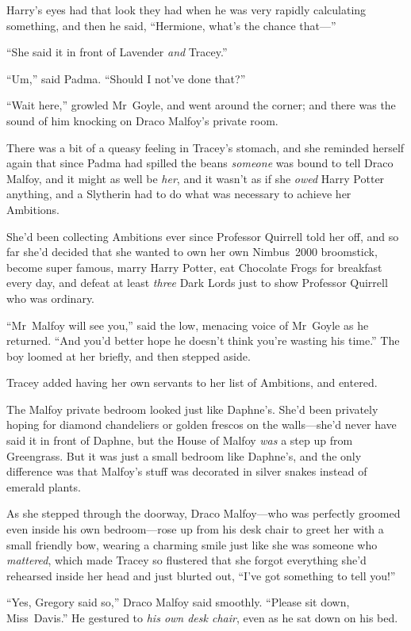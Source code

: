 Harry’s eyes had that look they had when he was very rapidly calculating something, and then he said, “Hermione, what’s the chance that—”

“She said it in front of Lavender \emph{and} Tracey.”

“Um,” said Padma. “Should I not’ve done that?”

\later

“Wait here,” growled Mr~Goyle, and went around the corner; and there was the sound of him knocking on Draco Malfoy’s private room.

There was a bit of a queasy feeling in Tracey’s stomach, and she reminded herself again that since Padma had spilled the beans \emph{someone} was bound to tell Draco Malfoy, and it might as well be \emph{her}, and it wasn’t as if she \emph{owed} Harry Potter anything, and a Slytherin had to do what was necessary to achieve her Ambitions.

She’d been collecting Ambitions ever since Professor Quirrell told her off, and so far she’d decided that she wanted to own her own Nimbus~2000 broomstick, become super famous, marry Harry Potter, eat Chocolate Frogs for breakfast every day, and defeat at least \emph{three} Dark Lords just to show Professor Quirrell who was ordinary.

“Mr~Malfoy will see you,” said the low, menacing voice of Mr~Goyle as he returned. “And you’d better hope he doesn’t think you’re wasting his time.” The boy loomed at her briefly, and then stepped aside.

Tracey added having her own servants to her list of Ambitions, and entered.

The Malfoy private bedroom looked just like Daphne’s. She’d been privately hoping for diamond chandeliers or golden frescos on the walls—she’d never have said it in front of Daphne, but the House of Malfoy \emph{was} a step up from Greengrass. But it was just a small bedroom like Daphne’s, and the only difference was that Malfoy’s stuff was decorated in silver snakes instead of emerald plants.

As she stepped through the doorway, Draco Malfoy—who was perfectly groomed even inside his own bedroom—rose up from his desk chair to greet her with a small friendly bow, wearing a charming smile just like she was someone who \emph{mattered}, which made Tracey so flustered that she forgot everything she’d rehearsed inside her head and just blurted out, “I’ve got something to tell you!”

“Yes, Gregory said so,” Draco Malfoy said smoothly. “Please sit down, Miss~Davis.” He gestured to \emph{his own desk chair}, even as he sat down on his bed.

